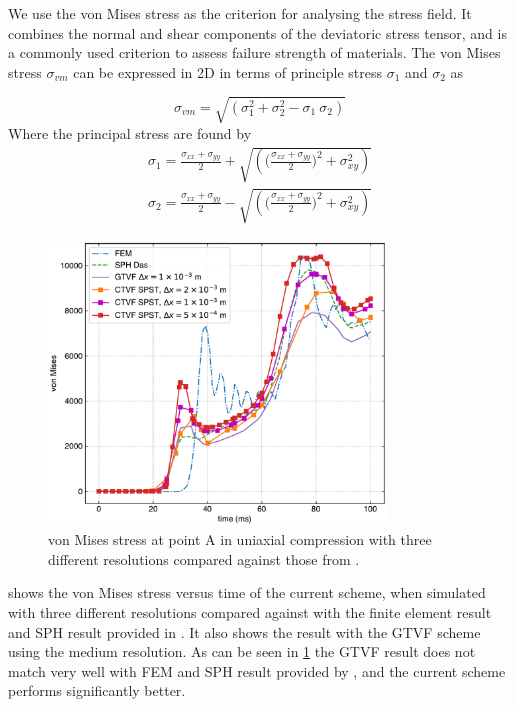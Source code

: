 \documentclass[preprint,12pt]{elsarticle}
\begin{document}
We use the von Mises stress as the criterion for analysing the stress field.
It combines the normal and shear components of the deviatoric stress tensor,
and is a commonly used criterion to assess failure strength of materials. The
von Mises stress $\sigma_{vm}$ can be expressed in 2D in terms of principle
stress $\sigma_1$ and $\sigma_2$ as

\begin{equation}
  \label{eq:von_mises_with_principal_stress}
  \sigma_{vm} = \sqrt{\left(\sigma_1^2 + \sigma_2^2 - \sigma_1 \ \sigma_2\right)}
\end{equation}
%
%
Where the principal stress are found by
\begin{eqnarray}
  \label{eq:principal_stress}
  \sigma_{1} = \frac{\sigma_{xx} + \sigma_{yy}}{2} + \sqrt{\left(\bigg(
  \frac{\sigma_{xx} + \sigma_{yy}}{2}\bigg)^2 + \sigma_{xy}^2\right)}\\
  \sigma_{2} = \frac{\sigma_{xx} + \sigma_{yy}}{2} -  \sqrt{\left(\bigg(
  \frac{\sigma_{xx} + \sigma_{yy}}{2}\bigg)^2 + \sigma_{xy}^2\right)}
\end{eqnarray}
%
\begin{figure}[!htpb]
  \centering
  \includegraphics[width=0.8\textwidth]{figures/uniaxial_compression/von_mises_A}
  \caption{von Mises stress at point A in uniaxial compression with three
    different resolutions compared against those from
    \cite{das2015evaluation}.}
\label{fig:uniaxial}
\end{figure}

 shows the von Mises stress versus time of the current
scheme, when simulated with three different resolutions compared against with
the finite element result and SPH result provided in \cite{das2015evaluation}.
It also shows the result with the GTVF scheme using the medium resolution. As
can be seen in \cref{fig:uniaxial} the GTVF result does not match very well
with FEM and SPH result provided by \citet{das2015evaluation}, and the current
scheme performs significantly better.
\end{document}
